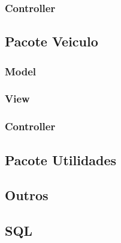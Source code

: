 \subsubsection{Controller}



\subsection{Pacote Veiculo}

\subsubsection{Model}



\subsubsection{View}



\subsubsection{Controller}



\subsection{Pacote Utilidades}




\subsection{Outros}





\subsection{SQL}

